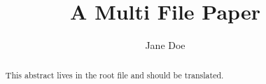 \documentclass{article}
\title{A Multi File Paper}
\author{Jane Doe}
\begin{document}
\maketitle

\begin{abstract}
This abstract lives in the root file and should be translated.
\end{abstract}




% 




\end{document}
